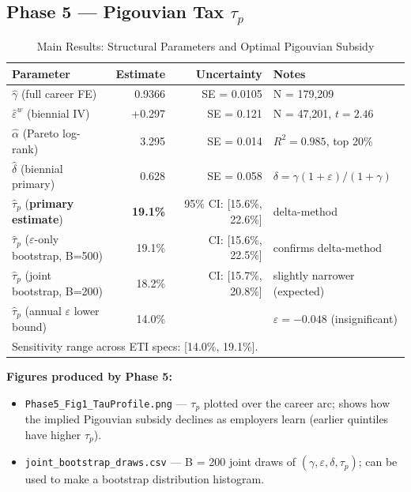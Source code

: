 \documentclass[11pt, letterpaper]{article}
\newcommand{\outputfile}[1]{\texttt{#1}}
\begin{document}
\newpage
\subsection{Phase 5 --- Pigouvian Tax $\tau_p$}

\begin{table}[h!]
\centering
\caption{Main Results: Structural Parameters and Optimal Pigouvian Subsidy}
\label{tab:main_results}
\begin{tabular}{lrrl}
\toprule
Parameter & Estimate & Uncertainty & Notes \\
\midrule
$\hat{\gamma}$ (full career FE) & 0.9366 & SE = 0.0105 & N = 179,209 \\
$\hat{\varepsilon}^w$ (biennial IV) & +0.297 & SE = 0.121 & N = 47,201, $t = 2.46$ \\
$\hat{\alpha}$ (Pareto log-rank) & 3.295 & SE = 0.014 & $R^2 = 0.985$, top 20\% \\
\midrule
$\hat{\delta}$ (biennial primary) & 0.628 & SE = 0.058 & $\delta = \gamma(1+\varepsilon)/(1+\gamma)$ \\
\midrule
$\hat{\tau}_p$ (\textbf{primary estimate}) & \textbf{19.1\%} & 95\% CI: [15.6\%, 22.6\%] & delta-method \\
$\hat{\tau}_p$ ($\varepsilon$-only bootstrap, B=500) & 19.1\% & CI: [15.6\%, 22.5\%] & confirms delta-method \\
$\hat{\tau}_p$ (joint bootstrap, B=200) & 18.2\% & CI: [15.7\%, 20.8\%] & slightly narrower (expected) \\
\midrule
$\hat{\tau}_p$ (annual $\varepsilon$ lower bound) & 14.0\% & & $\varepsilon = -0.048$ (insignificant) \\
\bottomrule
\multicolumn{4}{l}{\footnotesize Sensitivity range across ETI specs: [14.0\%, 19.1\%].}
\end{tabular}
\end{table}

\textbf{Figures produced by Phase 5:}
\begin{itemize}
    \item \outputfile{Phase5\_Fig1\_TauProfile.png} --- $\tau_p$ plotted over the career arc; shows how the implied Pigouvian subsidy declines as employers learn (earlier quintiles have higher $\tau_p$).
    \item \outputfile{joint\_bootstrap\_draws.csv} --- B = 200 joint draws of $(\gamma, \varepsilon, \delta, \tau_p)$; can be used to make a bootstrap distribution histogram.
\end{itemize}
\end{document}
